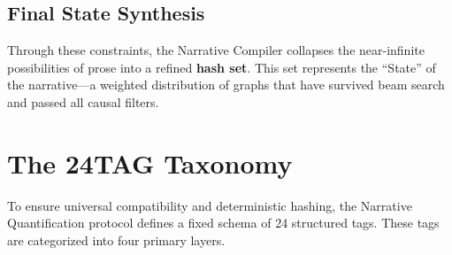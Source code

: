 \documentclass[11pt,a4paper]{article}
\begin{document}
\subsection{Final State Synthesis}

Through these constraints, the Narrative Compiler collapses the
near-infinite possibilities of prose into a refined \textbf{hash set}.
This set represents the ``State'' of the narrative---a weighted
distribution of graphs that have survived beam search and passed all
causal filters.

\section{The 24TAG Taxonomy}

To ensure universal compatibility and deterministic hashing, the
Narrative Quantification protocol defines a fixed schema of 24
structured tags. These tags are categorized into four primary layers.
\end{document}
